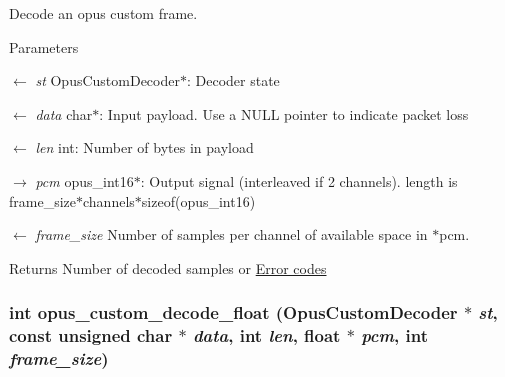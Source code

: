 Decode an opus custom frame. 
\begin{DoxyParams}{Parameters}
\item[\mbox{$\leftarrow$} {\em st}]{\ttfamily OpusCustomDecoder$\ast$}: Decoder state \item[\mbox{$\leftarrow$} {\em data}]{\ttfamily char$\ast$}: Input payload. Use a NULL pointer to indicate packet loss \item[\mbox{$\leftarrow$} {\em len}]{\ttfamily int}: Number of bytes in payload \item[\mbox{$\rightarrow$} {\em pcm}]{\ttfamily opus\_\-int16$\ast$}: Output signal (interleaved if 2 channels). length is frame\_\-size$\ast$channels$\ast$sizeof(opus\_\-int16) \item[\mbox{$\leftarrow$} {\em frame\_\-size}]Number of samples per channel of available space in $\ast$pcm. \end{DoxyParams}
\begin{DoxyReturn}{Returns}
Number of decoded samples or \hyperlink{group__opus__errorcodes}{Error codes} 
\end{DoxyReturn}
\hypertarget{group__opus__custom_gac2c34002d4f546a535125e2780c81656}{
\subsubsection[{opus\_\-custom\_\-decode\_\-float}]{\setlength{\rightskip}{0pt plus 5cm}int opus\_\-custom\_\-decode\_\-float ({\bf OpusCustomDecoder} $\ast$ {\em st}, \/  const unsigned char $\ast$ {\em data}, \/  int {\em len}, \/  float $\ast$ {\em pcm}, \/  int {\em frame\_\-size})}}
\label{group__opus__custom_gac2c34002d4f546a535125e2780c81656}


